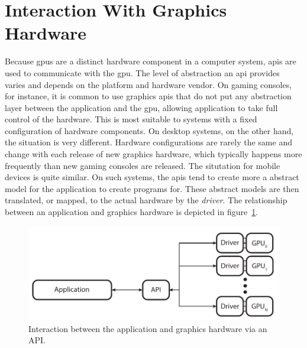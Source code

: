   \section{Interaction With Graphics Hardware}
  \label{sec:HardwareInteraction}
    Because \glspl{gpu} are a distinct hardware component in a computer system, \glspl{api} are used to communicate with the \gls{gpu}.
    The level of abstraction an \gls{api} provides varies and depends on the platform and hardware vendor.
    On gaming consoles, for instance, it is common to use graphics \glspl{api} that do not put any abstraction layer between the application and the \gls{gpu}, allowing application to take full control of the hardware.
    This is most suitable to systems with a fixed configuration of hardware components.
    On desktop systems, on the other hand, the situation is very different.
    Hardware configurations are rarely the same and change with each release of new graphics hardware, which typically happens more frequently than new gaming consoles are released.
    The situtation for mobile devices is quite similar.
    On such systems, the \glspl{api} tend to create more a abstract model for the application to create programs for.
    These abstract models are then translated, or mapped, to the actual hardware by the \textit{driver}.
    The relationship between an application and graphics hardware is depicted in figure~\ref{fig:AppApiDriverOverview}.

    \begin{figure}
      \label{fig:AppApiDriverOverview}
      \centering
      \includegraphics[width=\textwidth]{Main/Images/Application_API_Driver_Overview}
      \caption{Interaction between the application and graphics hardware via an API.}
    \end{figure}


